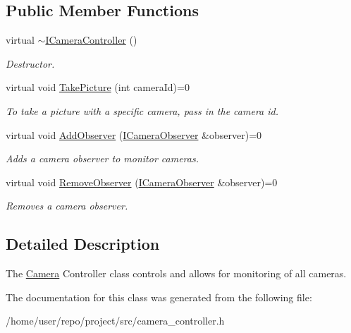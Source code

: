 \subsection*{Public Member Functions}
\begin{DoxyCompactItemize}
\item 
\mbox{\label{classICameraController_a7f1b88c7e023ad218d461684dc0d4fe5}} 
virtual \hyperlink{classICameraController_a7f1b88c7e023ad218d461684dc0d4fe5}{$\sim$\+I\+Camera\+Controller} ()
\begin{DoxyCompactList}\small\item\em Destructor. \end{DoxyCompactList}\item 
\mbox{\label{classICameraController_af9fff22819969ca260f7f098f0cdebf4}} 
virtual void \hyperlink{classICameraController_af9fff22819969ca260f7f098f0cdebf4}{Take\+Picture} (int camera\+Id)=0
\begin{DoxyCompactList}\small\item\em To take a picture with a specific camera, pass in the camera id. \end{DoxyCompactList}\item 
\mbox{\label{classICameraController_ad3cf56dc052984b0e31e602f344c35db}} 
virtual void \hyperlink{classICameraController_ad3cf56dc052984b0e31e602f344c35db}{Add\+Observer} (\hyperlink{classICameraObserver}{I\+Camera\+Observer} \&observer)=0
\begin{DoxyCompactList}\small\item\em Adds a camera observer to monitor cameras. \end{DoxyCompactList}\item 
\mbox{\label{classICameraController_a5013bc29f6a0e7794a97646d868bf809}} 
virtual void \hyperlink{classICameraController_a5013bc29f6a0e7794a97646d868bf809}{Remove\+Observer} (\hyperlink{classICameraObserver}{I\+Camera\+Observer} \&observer)=0
\begin{DoxyCompactList}\small\item\em Removes a camera observer. \end{DoxyCompactList}\end{DoxyCompactItemize}


\subsection{Detailed Description}
The \hyperlink{classCamera}{Camera} Controller class controls and allows for monitoring of all cameras. 

The documentation for this class was generated from the following file\+:\begin{DoxyCompactItemize}
\item 
/home/user/repo/project/src/camera\+\_\+controller.\+h\end{DoxyCompactItemize}

